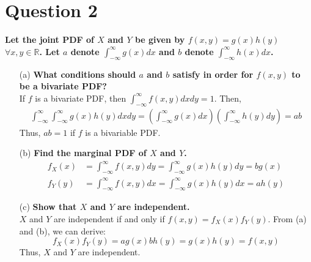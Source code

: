 \documentclass{article}
\newcommand{\R}{\mathbb{R}}
\newcommand{\intinf}{\int_{-\infty}^{\infty}}
\begin{document}
\section*{Question 2}
\textbf{Let the joint PDF of $X$ and $Y$ be given by $f(x,y)=g(x)h(y)$ $\forall x,y\in\R$. Let $a$ denote $\intinf g(x)dx$ and $b$ denote $\intinf h(x)dx$.}
\begin{itemize}
	\item[(a)] \textbf{What conditions should $a$ and $b$ satisfy in order for $f(x,y)$ to be a bivariate PDF?}
	\bigskip \\
	If $f$ is a bivariate PDF, then $\intinf f(x,y)dxdy=1$. Then,
	\begin{align*}
		\intinf\intinf g(x)h(y)dxdy = \left( \intinf g(x)dx \right)\left( \intinf h(y)dy \right) = ab
	\end{align*}
	Thus, $ab=1$ if $f$ is a bivariable PDF.
	
	\item[(b)] \textbf{Find the marginal PDF of $X$ and $Y$.}
	\bigskip \\
	\begin{align*}
		f_X(x) &= \intinf f(x,y)dy = \intinf g(x)h(y)dy = bg(x)	\\
		f_Y(y) &= \intinf f(x,y)dx = \intinf g(x)h(y)dx = ah(y)	
	\end{align*}

	\item[(c)] \textbf{Show that $X$ and $Y$ are independent.}
	\bigskip \\
	$X$ and $Y$ are independent if and only if $f(x,y)=f_X(x)f_Y(y)$. From (a) and (b), we can derive:
	\[
		f_X(x)f_Y(y) = ag(x)bh(y) = g(x)h(y) = f(x,y)
	\]
	Thus, $X$ and $Y$ are independent.
	
\end{itemize}


\end{document}
